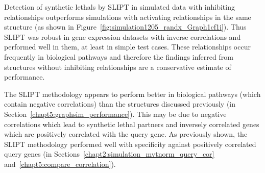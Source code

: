 Detection of \glspl{synthetic lethal} by \gls{SLIPT} in simulated data with inhibiting relationships outperforms simulations with activating relationships in the same  structure (as shown in Figure~\ref{fig:simulation1205_randx_Graph1cf1i}). Thus \gls{SLIPT} was robust in \gls{gene expression} datasets with inverse correlations and performed well in them, at least in simple test cases. These relationships occur frequently in biological pathways and therefore the findings inferred from  structures without inhibiting relationships are a conservative estimate of performance.

The \gls{SLIPT} methodology \textcolor{black}{appears to perform} better in biological pathways (which contain negative correlations) than the  structures discussed previously (in Section~\ref{chapt5:graphsim_performance}). This may be due to negative correlations \textcolor{black}{which} lead to \gls{synthetic lethal} partners and inversely correlated genes which are positively correlated with the query gene. As previously shown, the \gls{SLIPT} methodology performed well with specificity against positively correlated query genes (in Sections~\ref{chapt2:simulation_mvtnorm_query_cor} and~\ref{chapt5:compare_correlation}).%

